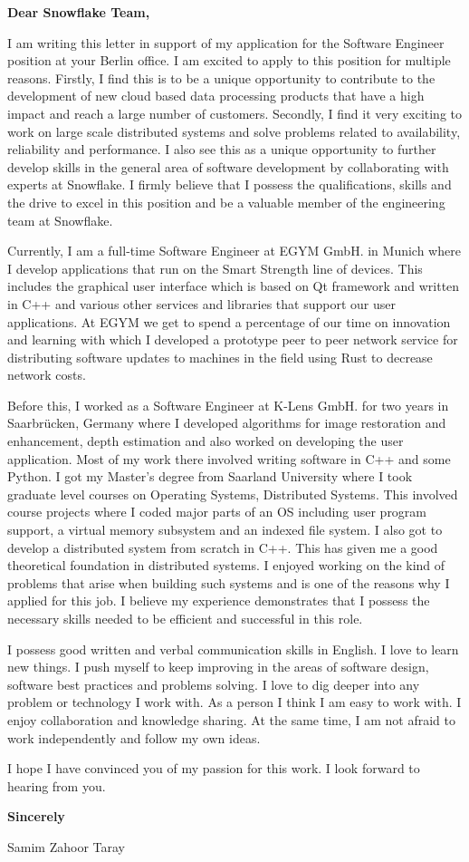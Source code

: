 \documentclass[letterpaper,11pt]{article}
\begin{document}
\textbf{Dear Snowflake Team,}
\vspace{1cm}


I am writing this letter in support of my application for the Software Engineer
position at your Berlin office. I am excited to apply to this position for multiple reasons. Firstly, I
find this is to be a unique opportunity to contribute to the development of
new cloud based data processing products that have a high impact and reach a
large number of customers.
Secondly, I find it very exciting to work on large scale distributed systems
and solve problems related to availability, reliability and performance.
I also see this as a unique opportunity to further develop skills in the general
area of software development by collaborating with experts at Snowflake.
I firmly believe that I possess the qualifications, skills and the drive to
excel in this position and be a valuable member of the engineering team at
Snowflake.

Currently, I am a full-time Software Engineer at EGYM GmbH. in Munich where I
develop applications that run on the Smart Strength line of devices. This
includes the graphical user interface which is based on Qt framework and written
in C++ and various other services and libraries that support our user applications.
At EGYM we get to spend a percentage of our time on innovation and learning with
which I developed a prototype peer to peer network service for distributing
software updates to machines in the field using Rust to decrease network
costs.

Before this, I worked as a Software Engineer at K-Lens GmbH. for two years in Saarbr\"ucken,
Germany where I developed algorithms for image restoration and enhancement,
depth estimation and also worked on developing the user application. Most of my
work there involved writing software in C++ and some Python.
I got my Master's degree from Saarland University where I took graduate level
courses on Operating Systems, Distributed Systems. This involved course projects
where I coded major parts of an OS including user program support, a virtual
memory subsystem and an indexed file system. I also got to develop a distributed system
from scratch in C++. This has given me a good theoretical foundation in distributed systems.
I enjoyed working on the kind of problems that arise when building such systems
and is one of the reasons why I applied for this job. I believe my experience
demonstrates that I possess the necessary skills needed to be efficient and
successful in this role.

I possess good written and verbal communication skills in English. I love to learn new things.
I push myself to keep improving in the areas of software design,
software best practices and problems solving. I love to dig deeper into any
problem or technology I work with. As a person I think I am easy to work with.
I enjoy collaboration and knowledge sharing. At the same time, I am not afraid
to work independently and follow my own ideas.

I hope I have convinced you of my passion for this work. I look forward to
hearing from you.

\vspace{1cm}
\textbf{Sincerely}

Samim Zahoor Taray
\end{document}
